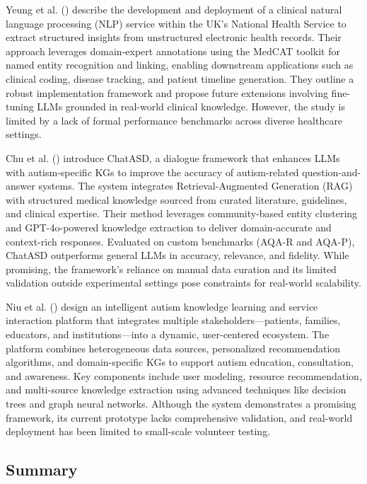\documentclass[pdflatex,sn-basic]{sn-jnl}%
\theoremstyle{thmstyleone}%
\theoremstyle{thmstyletwo}%
\theoremstyle{thmstylethree}%
\begin{document}
  Yeung et al. (\cite{au_yeung_natural_2024}) describe the development and deployment of a clinical natural language processing
  (NLP) service within the UK’s National Health Service to extract structured insights from unstructured electronic health
  records. Their approach leverages domain-expert annotations using the MedCAT toolkit for named entity recognition and linking,
  enabling downstream applications such as clinical coding, disease tracking, and patient timeline generation. They outline a
  robust implementation framework and propose future extensions involving fine-tuning LLMs grounded in real-world clinical
  knowledge. However, the study is limited by a lack of formal performance benchmarks across diverse healthcare settings.

  Chu et al. (\cite{chu_chatasd_2024}) introduce ChatASD, a dialogue framework that enhances LLMs with autism-specific KGs to
  improve the accuracy of autism-related question-and-answer systems. The system integrates Retrieval-Augmented Generation (RAG)
  with structured medical knowledge sourced from curated literature, guidelines, and clinical expertise. Their method leverages
  community-based entity clustering and GPT-4o-powered knowledge extraction to deliver domain-accurate and context-rich
  responses. Evaluated on custom benchmarks (AQA-R and AQA-P), ChatASD outperforms general LLMs in accuracy, relevance, and
  fidelity. While promising, the framework's reliance on manual data curation and its limited validation outside experimental
  settings pose constraints for real-world scalability.

  Niu et al. (\cite{niu_intelligent_2024-1}) design an intelligent autism knowledge learning and service interaction platform
  that integrates multiple stakeholders—patients, families, educators, and institutions—into a dynamic, user-centered ecosystem.
  The platform combines heterogeneous data sources, personalized recommendation algorithms, and domain-specific KGs to support
  autism education, consultation, and awareness. Key components include user modeling, resource recommendation, and multi-source
  knowledge extraction using advanced techniques like decision trees and graph neural networks. Although the system demonstrates
  a promising framework, its current prototype lacks comprehensive validation, and real-world deployment has been limited to
  small-scale volunteer testing.

  \subsection{Summary}
\end{document}
